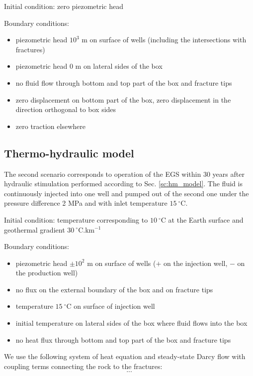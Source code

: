 \documentclass{article}
\begin{document}
Initial condition: zero piezometric head

Boundary conditions:
\begin{itemize}
\item piezometric head $10^3$ m on surface of wells (including the intersections with fractures)
\item piezometric head 0 m on lateral sides of the box
\item no fluid flow through bottom and top part of the box and fracture tips
\item zero displacement on bottom part of the box, zero displacement in the direction orthogonal to box sides
\item zero traction elsewhere
\end{itemize}



\subsection{Thermo-hydraulic model}

The second scenario corresponds to operation of the EGS within 30 years after hydraulic stimulation performed according to Sec. \ref{sc:hm_model}.
The fluid is continuously injected into one well and pumped out of the second one under the pressure difference 2 MPa and with inlet temperature $15\ ^\circ$C.

Initial condition:
temperature corresponding to $10\ ^\circ$C at the Earth surface and geothermal gradient $30\ ^\circ$C.km${}^{-1}$

Boundary conditions:
\begin{itemize}
\item piezometric head $\pm10^2$ m on surface of wells ($+$ on the injection well, $-$ on the production well)
\item no flux on the external boundary of the box and on fracture tips
\item temperature $15\ ^\circ$C on surface of injection well
\item initial temperature on lateral sides of the box where fluid flows into the box
\item no heat flux through bottom and top part of the box and fracture tips
\end{itemize}

We use the following system of heat equation and steady-state Darcy flow with coupling terms connecting the rock to the fractures:
\[ ... \]
\end{document}
